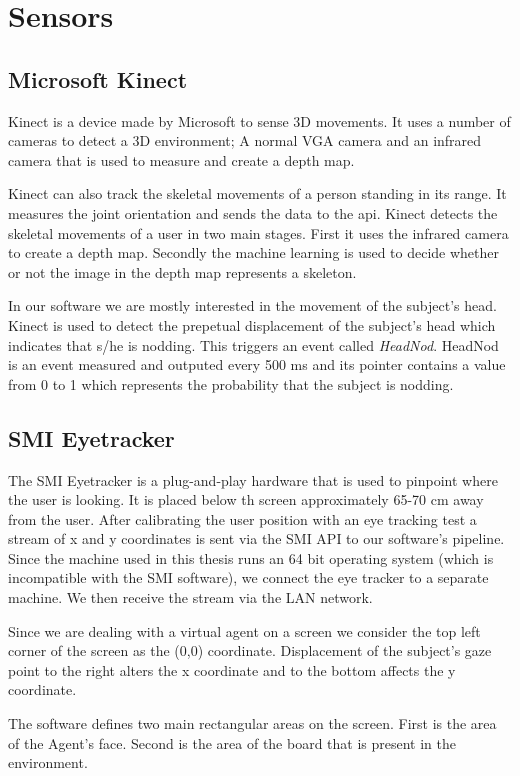 \documentclass[12pt, a4paper, fleqn]{memoir}%
\begin{document}
\section{Sensors}
\label{sec:Sensors}

\subsection{Microsoft Kinect}
Kinect is a device made by Microsoft to sense 3D movements. It uses a number of cameras to detect a 3D environment; A normal VGA camera and an infrared camera that is used to measure and create a depth map.

Kinect can also track the skeletal movements of a person standing in its range. It measures the joint orientation and sends the data to the api. Kinect detects the skeletal movements of a user in two main stages. First it uses the infrared camera to create a depth map. Secondly the machine learning is used to decide whether or not the image in the depth map represents a skeleton.

In our software we are mostly interested in the movement of the subject's head. Kinect is used to detect the prepetual displacement of the subject's head which indicates that s/he is nodding. This triggers an event called \textit{HeadNod}. HeadNod is an event measured and outputed every 500 ms and its pointer contains a value from 0 to 1 which represents the probability that the subject is nodding.

\subsection{SMI Eyetracker}
The SMI Eyetracker is a plug-and-play hardware that is used to pinpoint where the user is looking. It is placed below th screen approximately 65-70 cm away from the user. After calibrating the user position with an eye tracking test a stream of x and y coordinates is sent via the SMI API to our software's pipeline. Since the machine used in this thesis runs an 64 bit operating system (which is incompatible with the SMI software), we connect the eye tracker to a separate machine. We then receive the stream via the LAN network.

Since we are dealing with a virtual agent on a screen we consider the top left corner of the screen as the (0,0) coordinate. Displacement of the subject's gaze point to the right alters the x coordinate and to the bottom affects the y coordinate.

The software defines two main rectangular areas on the screen. First is the area of the Agent's face. Second is the area of the board that is present in the environment.
\end{document}
